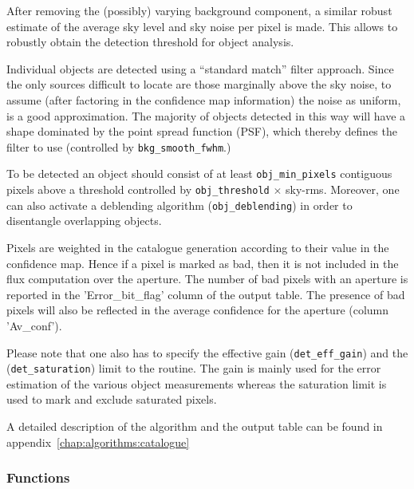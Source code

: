After removing the (possibly) varying background component, a similar
robust estimate of the average sky level and sky noise per pixel is
made. This allows to robustly obtain the detection threshold for
object analysis.

Individual objects are detected using a ``standard match'' filter
approach. Since the only sources difficult to locate are those
marginally above the sky noise, to assume (after factoring in the
confidence map information) the noise as uniform, is a good
approximation. The majority of objects detected in this way 
will have a shape dominated by the point spread function (PSF), 
which thereby defines the filter to use (controlled by 
\verb+bkg_smooth_fwhm+.)

To be detected an object should consist of at least
\verb+obj_min_pixels+ contiguous pixels above a threshold controlled
by \verb+obj_threshold+ $\times$ sky-rms. Moreover, one can also
activate a deblending algorithm (\verb+obj_deblending+) in order to
disentangle overlapping objects.

Pixels are weighted in the catalogue generation according to their
value in the confidence map.  Hence if a pixel is marked as bad, then
it is not included in the flux computation over the aperture.  
The number of bad pixels
with an aperture is reported in the 'Error\_bit\_flag' column of the
output table.  The presence of bad pixels will also be reflected in
the average confidence for the aperture (column 'Av\_conf').

Please note that one also has to specify the effective gain
(\verb+det_eff_gain+) and the (\verb+det_saturation+) limit to the
routine. The gain is mainly used for the error estimation of the
various object measurements whereas the saturation limit is used to
mark and exclude saturated pixels.

%
%
%
%
%
%
%
%

A detailed description of the algorithm and the output table can be
found in appendix~\ref{chap:algorithms:catalogue}

 
\subsubsection{Functions}
\label{catalogue:functions}

